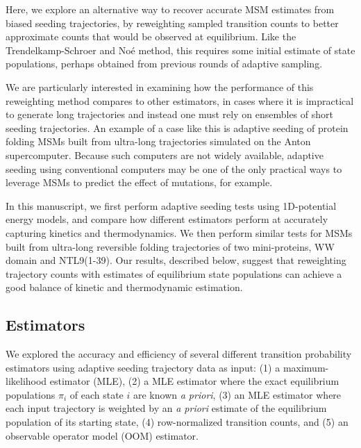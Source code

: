 \documentclass[%
 aip,
rsi,%
 amsmath,amssymb,
 reprint,%
]{revtex4-1}
\begin{document}
Here, we explore an alternative way to recover accurate MSM estimates from biased seeding trajectories, by reweighting sampled transition counts to better approximate counts that would be observed at equilibrium.  Like the Trendelkamp-Schroer and No{\'e} method,\cite{trendelkamp2016efficient} this requires some initial estimate of state populations, perhaps obtained from previous rounds of adaptive sampling.

We are particularly interested in examining how the performance of this reweighting method compares to other estimators, in cases where it is impractical to generate long trajectories and instead one must rely on ensembles of short seeding trajectories. An example of a case like this is adaptive seeding of protein folding MSMs built from ultra-long trajectories simulated on the Anton supercomputer.\cite{LindorffLarsen:2011gl} Because such computers are not widely available, adaptive seeding using conventional computers may be one of the only practical ways to leverage MSMs to predict the effect of mutations, for example. 

In this manuscript, we first perform adaptive seeding tests using 1D-potential energy models, and compare how different estimators perform at accurately capturing kinetics and thermodynamics.  We then perform similar tests for MSMs built from  ultra-long reversible folding trajectories of two mini-proteins, WW domain and NTL9(1-39). Our results, described below, suggest that reweighting trajectory counts with estimates of equilibrium state populations can achieve a good balance of kinetic and thermodynamic estimation.

\subsection*{Estimators}

We explored the accuracy and efficiency of several different transition probability estimators using  adaptive seeding trajectory data as input: (1) a maximum-likelihood estimator (MLE), (2) a MLE estimator where the exact equilibrium populations $\pi_i$ of each state $i$ are known \textit{a priori}, (3) an MLE estimator where each input trajectory is weighted by an \textit{a priori} estimate of the equilibrium population of its starting state, (4) row-normalized transition counts, and (5) an observable operator model (OOM) estimator.
\end{document}
